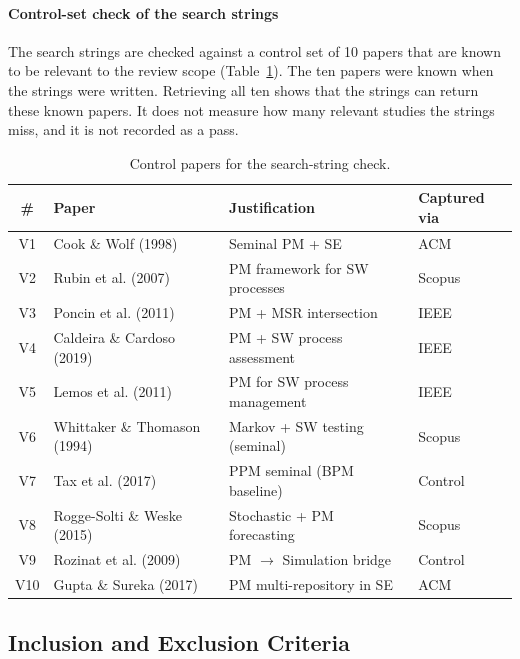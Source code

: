 \paragraph{Control-set check of the search strings}
The search strings are checked against a control set of 10 papers that are
known to be relevant to the review scope
(Table~\ref{tab:validation-set}). The ten papers were known when the
strings were written. Retrieving all ten shows that the strings can
return these known papers. It does not measure how many relevant studies
the strings miss, and it is not recorded as a pass.

\begin{table}[htbp]
\centering
\caption{Control papers for the search-string check.}
\label{tab:validation-set}
\small
\setlength{\tabcolsep}{4pt}
\begin{tabular}{c p{4.5cm} p{4.1cm} p{1.6cm}}
\toprule
\textbf{\#} & \textbf{Paper} & \textbf{Justification} & \textbf{Captured via} \\
\midrule
V1  & Cook \& Wolf (1998)            & Seminal PM + SE                    & ACM \\
V2  & Rubin et al. (2007)            & PM framework for SW processes      & Scopus \\
V3  & Poncin et al. (2011)           & PM + MSR intersection              & IEEE \\
V4  & Caldeira \& Cardoso (2019)     & PM + SW process assessment         & IEEE \\
V5  & Lemos et al. (2011)            & PM for SW process management       & IEEE \\
V6  & Whittaker \& Thomason (1994)   & Markov + SW testing (seminal)      & Scopus \\
V7  & Tax et al. (2017)              & PPM seminal (BPM baseline)         & Control \\
V8  & Rogge-Solti \& Weske (2015)    & Stochastic + PM forecasting        & Scopus \\
V9  & Rozinat et al. (2009)          & PM $\rightarrow$ Simulation bridge & Control \\
V10 & Gupta \& Sureka (2017)         & PM multi-repository in SE          & ACM \\
\bottomrule
\end{tabular}
\end{table}


\subsection{Inclusion and Exclusion Criteria}
\label{sec:slr-criteria}

